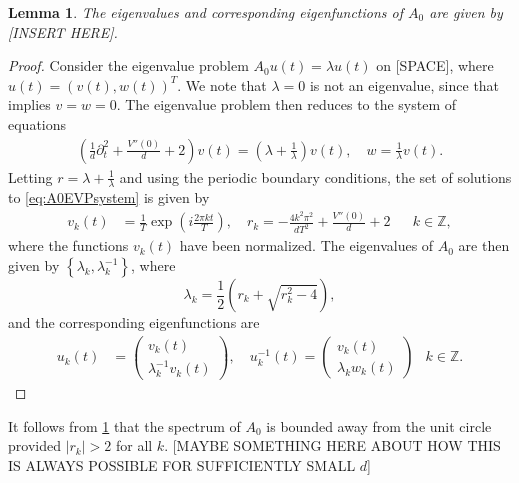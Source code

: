 \documentclass[12pt,reqno]{amsart}
\def\Z{{\mathbb Z}}
\newtheorem{lemma}{Lemma}
\begin{document}
\begin{lemma}\label{lemma:A0eigs}
The eigenvalues and corresponding eigenfunctions of $A_0$ are given by [INSERT HERE].
\end{lemma}
\begin{proof}
Consider the eigenvalue problem $A_0 u(t) = \lambda u(t)$ on [SPACE], where $u(t) = (v(t), w(t))^T$. We note that $\lambda = 0$ is not an eigenvalue, since that implies $v = w = 0$. The eigenvalue problem then reduces to the system of equations
\begin{align}\label{eq:A0EVPsystem}
\left( \frac{1}{d}\partial_t^2 + \frac{V''(0)}{d} + 2 \right) v(t) = \left( \lambda + \frac{1}{\lambda} \right) v(t), \quad
w = \frac{1}{\lambda} v(t).
\end{align}
Letting $r = \lambda + \frac{1}{\lambda}$ and using the periodic boundary conditions, the set of solutions to \cref{eq:A0EVPsystem} is given by
\begin{align}
v_k(t) &= \frac{1}{T} \exp\left( i \frac{2 \pi k t}{T} \right), \quad r_k = -\frac{4 k^2 \pi^2}{d T^2} + \frac{V''(0)}{d} + 2 && k \in \Z,
\end{align}
where the functions $v_k(t)$ have been normalized. The eigenvalues of $A_0$ are then given by $\left\{ \lambda_k, \lambda_k^{-1} \right\}$, where
\begin{equation}\label{eq:A0lambdak}
\lambda_k = \frac{1}{2}\left( r_k + \sqrt{r_k^2 - 4} \right),
\end{equation}
and the corresponding eigenfunctions are
\begin{align}
u_k(t) &= \begin{pmatrix}v_k(t) \\ \lambda_k^{-1}  v_k(t) \end{pmatrix}, \quad
u_k^{-1}(t) = \begin{pmatrix}v_k(t) \\ \lambda_k w_k(t) \end{pmatrix} & k \in \Z.
\end{align}
\end{proof}

It follows from \cref{lemma:A0eigs} that the spectrum of $A_0$ is bounded away from the unit circle provided $|r_k| > 2$ for all $k$. [MAYBE SOMETHING HERE ABOUT HOW THIS IS ALWAYS POSSIBLE FOR SUFFICIENTLY SMALL $d$]
\end{document}
